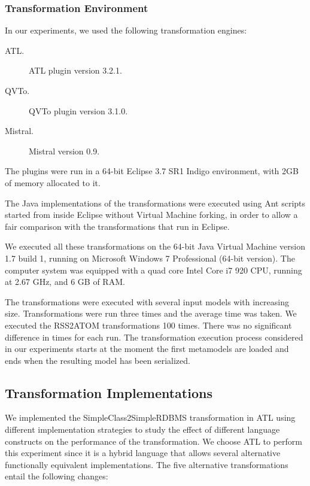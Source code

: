 \documentclass[12pt]{elsarticle}
\begin{document}
\subsubsection*{Transformation Environment}

In our experiments, we used the following transformation engines:

\begin{description}
\item[ATL.] ATL plugin version 3.2.1.
\item[QVTo.] QVTo plugin version 3.1.0.
\item[Mistral.] Mistral version 0.9.
\end{description}

The plugins were run in a 64-bit Eclipse 3.7 SR1 Indigo environment, with 2GB of
memory allocated to it.

The Java implementations of the transformations were executed using Ant scripts
started from inside Eclipse without Virtual Machine forking, in order to allow a
fair comparison with the transformations that run in Eclipse.

We executed all these transformations on the 64-bit Java Virtual Machine version
1.7 build 1, running on Microsoft Windows 7 Professional (64-bit version).  The
computer system was equipped with a quad core Intel Core i7 920 CPU, running at
2.67 GHz, and 6 GB of RAM.

The transformations were executed with several input models with increasing
size. Transformations were run three times and the average time was
taken. We executed the RSS2ATOM transformations 100 times. There was no
significant difference in times for each run. The transformation execution
process considered in our experiments starts at the moment the first metamodels
are loaded and ends when the resulting model has been serialized.

\subsection{Transformation Implementations}

We implemented the SimpleClass2SimpleRDBMS transformation in ATL using different implementation strategies to study the effect
of different language constructs on the performance of the transformation.
We choose ATL to perform this experiment since it is a hybrid language that allows
several alternative functionally equivalent implementations. The five
alternative transformations entail the following changes:
\end{document}
